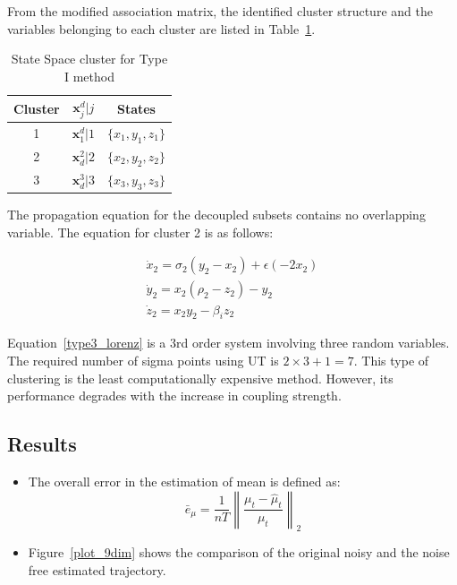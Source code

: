 From the modified association matrix, the identified cluster structure and the variables belonging to each cluster are listed in Table~\ref{Type3_cluster_lorenz}.

\begin{table}[H]
\centering
\caption{State Space cluster for Type I method}
\label{Type3_cluster_lorenz}
\begin{tabular}{c|c|c}
\hline 
Cluster & $\textbf{x}^d_j|j$ & States \\
\hline 
1 & $\textbf{x}^d_1|1$ & $\lbrace x_1,y_1,z_1 \rbrace$ \\ 
2 & $\textbf{x}_d^2|2$ & $\lbrace x_2,y_2,z_2 \rbrace$  \\ 
3 & $\textbf{x}_d^3|3$ & $\lbrace x_3, y_3, z_3 \rbrace$ \\ 
\hline 
\end{tabular} 
\end{table}

The propagation equation for the decoupled subsets contains no overlapping variable. The equation for cluster 2 is as follows:

\begin{equation}
\label{type3_lorenz}
\begin{array}{l}
\dot{x}_2 = \sigma_2(y_2 - x_2) +\epsilon(- 2x_2) \\
\dot{y}_2 = x_2 (\rho_2 - z_2) - y_2 \\
\dot{z}_2 = x_2 y_2 - \beta_i z_2 
\end{array}
\end{equation}

Equation~\ref{type3_lorenz} is a 3rd order system involving three random variables. The required number of sigma points using UT is $2 \times 3 + 1 = 7$. This type of clustering is the least computationally expensive method. However, its performance degrades with the increase in coupling strength. 

\subsection{Results}

\begin{itemize}
\item The overall error in the estimation of mean is defined as:
\begin{equation}
\bar{e}_{\mu} = \frac{1}{nT} \left\lVert \frac{\mu_t - \hat{\mu}_t}{\mu_t} \right\rVert_2
\end{equation}
\item Figure~\ref{plot_9dim} shows the comparison of the original noisy and the noise free estimated trajectory.  
\end{itemize}

